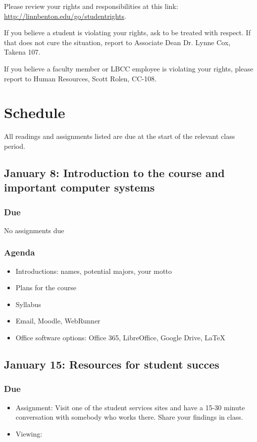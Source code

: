 \documentclass[12pt,article,oneside]{memoir}
\begin{document}
Please review your rights and responsibilities at this link: \url{http://linnbenton.edu/go/studentrights}.

If you believe a student is violating your rights, ask to be treated with respect. If that does not cure the situation, report to Associate Dean Dr. Lynne Cox, Takena 107.

If you believe a faculty member or LBCC employee is violating your rights, please report to Human Resources, Scott Rolen, CC-108.

\newpage

\section{Schedule}

All readings and assignments listed are due at the start of the relevant class period.

\subsection{January 8: Introduction to the course and important computer systems}

\subsubsection{Due}
No assignments due

\subsubsection{Agenda}
\begin{itemize}
 \item Introductions: names, potential majors, your motto
 \item Plans for the course
 \item Syllabus
 \item Email, Moodle, WebRunner
 \item Office software options: Office 365, LibreOffice, Google Drive, \LaTeX
\end{itemize}


\subsection{January 15: Resources for student succes}
\subsubsection{Due}
\begin{itemize}
 \item Assignment: Visit one of the student services sites and have a 15-30 minute conversation with somebody who works there.  Share your findings in class.
 \item Viewing: \cite{tannahill} 
\end{itemize}
\end{document}
